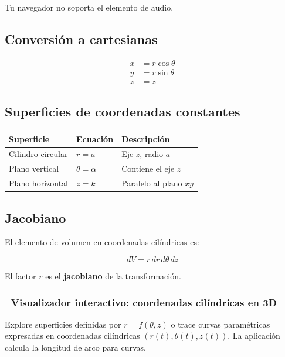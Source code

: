 \documentclass[
]{book}
\begin{document}
Tu navegador no soporta el elemento de audio.

\subsection{Conversión a cartesianas}\label{conversiuxf3n-a-cartesianas}

\[
\begin{aligned}
x &= r \cos\theta \\
y &= r \sin\theta \\
z &= z
\end{aligned}
\]

\subsection{Superficies de coordenadas constantes}\label{superficies-de-coordenadas-constantes}

\begin{longtable}[]{@{}lll@{}}
\toprule\noalign{}
Superficie & Ecuación & Descripción \\
\midrule\noalign{}
\endhead
\bottomrule\noalign{}
\endlastfoot
Cilindro circular & \(r = a\) & Eje \(z\), radio \(a\) \\
Plano vertical & \(\theta = \alpha\) & Contiene el eje \(z\) \\
Plano horizontal & \(z = k\) & Paralelo al plano \(xy\) \\
\end{longtable}

\subsection{Jacobiano}\label{jacobiano}

El elemento de volumen en coordenadas cilíndricas es:

\[
dV = r \, dr \, d\theta \, dz
\]

El factor \(r\) es el \textbf{jacobiano} de la transformación.

\subsubsection{🧮 Visualizador interactivo: coordenadas cilíndricas en 3D}\label{visualizador-interactivo-coordenadas-ciluxedndricas-en-3d}

Explore superficies definidas por \(r = f(\theta, z)\) o trace curvas paramétricas expresadas en coordenadas cilíndricas \((r(t), \theta(t), z(t))\). La aplicación calcula la longitud de arco para curvas.
\end{document}
